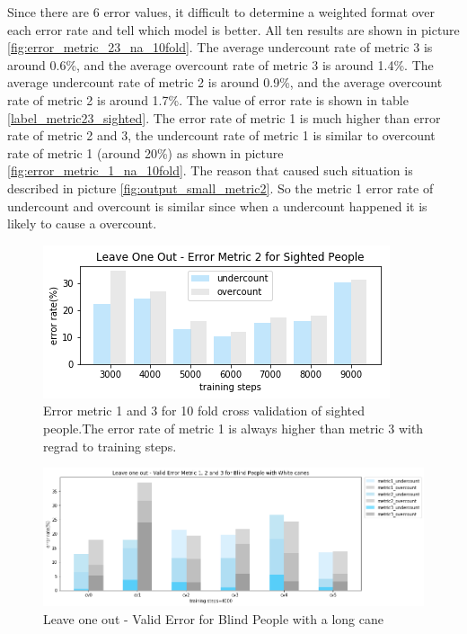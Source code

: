 \documentclass[11pt]{article}
\begin{document}
{Since there are 6 error values, it difficult to determine a weighted format over each error rate and tell which model is better. All ten results are shown in picture \ref{fig:error_metric_23_na_10fold}.
The average undercount rate of metric 3 is around 0.6\%, and the average overcount rate of metric 3 is around 1.4\%.  
The average undercount rate of metric 2 is around 0.9\%, and the average overcount rate of metric 2 is around 1.7\%.  
The value of error rate is shown in table \ref{label_metric23_sighted}. The error rate of metric 1 is much higher than error rate of metric 2 and 3, the undercount rate of metric 1  is similar to overcount rate of metric 1 (around 20\%) as shown in picture \ref{fig:error_metric_1_na_10fold}. The reason that caused such situation is described in picture \ref{fig:output_small_metric2}. So the metric 1 error rate of undercount and overcount is similar since when a undercount happened it is likely to cause a overcount.

\begin{figure}[ht]
\centering
\includegraphics[scale=0.55]{error_metric_2_na_step}
\caption{Error metric 1 and 3 for 10 fold cross validation of sighted people.The error rate of metric 1 is always higher than metric 3 with regrad to training steps.}
\label{fig:error_metric_2_na_step}
\end{figure}


\begin{figure}[ht]
\centering
\includegraphics[scale=0.5]{error_metric_wc_10fold_valid4000}
\caption{Leave one out - Valid Error for Blind People with a long cane}
\label{fig:error_metric_wc_10fold_valid4000}
\end{figure}


}
\end{document}
